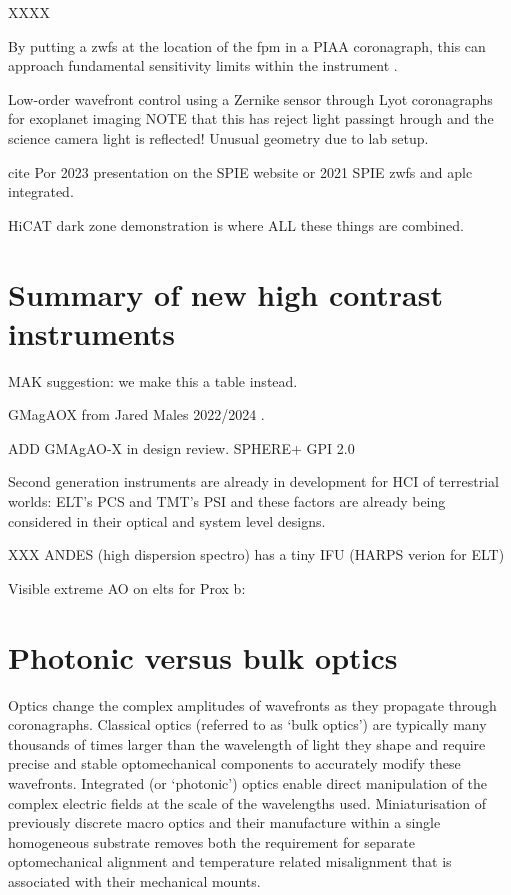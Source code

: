 \documentclass[letterpaper]{ar-1col}
\begin{document}
XXXX

%
By putting a \ac{zwfs} at the location of the \ac{fpm} in a PIAA coronagraph, this can approach fundamental sensitivity limits within the instrument \citep{Haffert23}.


Low-order wavefront control using a Zernike sensor through Lyot coronagraphs for exoplanet imaging
\citep{Pourcelot22,Pourcelot23} NOTE that this has reject light passingt hrough and the science camera light is reflected! Unusual geometry due to lab setup.

cite Por 2023 presentation on the SPIE website or 2021 SPIE \ac{zwfs} and \ac{aplc} integrated. 


HiCAT dark zone demonstration \citep{Soummer22} is where ALL these things are combined. 


\section{Summary of new high contrast instruments}

MAK suggestion: we make this a table instead.



GMagAOX from Jared Males 2022/2024 \citep{Males22}.

ADD GMAgAO-X in design review.
SPHERE+
GPI 2.0


Second generation instruments are already in development for HCI of terrestrial worlds: ELT's PCS \citep{Kasper21} and TMT's PSI \citep{Jensen-Clem22,Fitzgerald22} and these factors are already being considered in their optical and system level designs.


XXX ANDES (high dispersion spectro) has a tiny IFU (HARPS verion for ELT)



Visible extreme AO on \acp{elt} for Prox b: \citep{Fowler23}


\section{Photonic versus bulk optics}

Optics change the complex amplitudes of wavefronts as they propagate through coronagraphs.
%
Classical optics (referred to as `bulk optics') are typically many thousands of times larger than the wavelength of light they shape and require precise and stable optomechanical components to accurately modify these wavefronts.
%
Integrated (or `photonic') optics enable direct manipulation of the complex electric fields at the scale of the wavelengths used.
%
Miniaturisation of previously discrete macro optics and their manufacture within a single homogeneous substrate removes both the requirement for separate optomechanical alignment and temperature related misalignment that is associated with their mechanical mounts.
%
\end{document}

